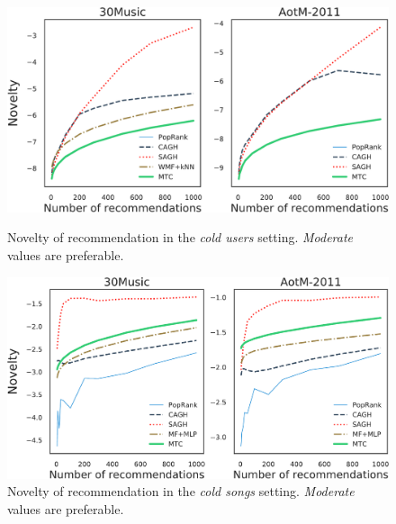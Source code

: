 \begin{figure}[!h]
    \centering
    \begin{minipage}{0.45\textwidth}
        \centering
        \includegraphics[width=\columnwidth]{fig/nov4.pdf}
        \caption{Novelty of recommendation in the \emph{cold users} setting. \emph{Moderate} values are preferable.}
        \label{fig:nov4}
    \end{minipage}\hspace{15pt}
    \begin{minipage}{0.45\textwidth}
        \centering
        \includegraphics[width=\columnwidth]{fig/nov1.pdf}
        \caption{Novelty of recommendation in the \emph{cold songs} setting. \emph{Moderate} values are preferable.}
        \label{fig:nov1}
    \end{minipage}
\end{figure}


\clearpage
\newpage
\onecolumn


